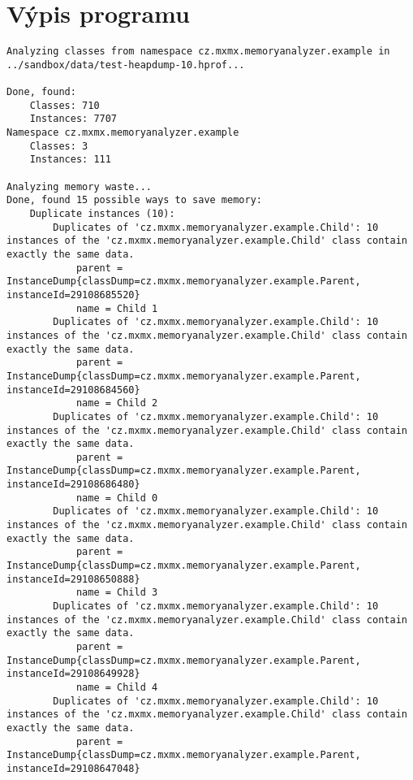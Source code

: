 \chapter{Výpis programu}
\label{runtime-log}
\begin{minipage}{\linewidth}
\begin{lstlisting}[basicstyle=\tiny,columns=fullflexible,frame=single,breaklines=true,postbreak=\mbox{\textcolor{red}{$\hookrightarrow$}\space}]
Analyzing classes from namespace cz.mxmx.memoryanalyzer.example in ../sandbox/data/test-heapdump-10.hprof...

Done, found:
    Classes: 710
    Instances: 7707
Namespace cz.mxmx.memoryanalyzer.example
    Classes: 3
    Instances: 111

Analyzing memory waste...
Done, found 15 possible ways to save memory:
    Duplicate instances (10):
        Duplicates of 'cz.mxmx.memoryanalyzer.example.Child': 10 instances of the 'cz.mxmx.memoryanalyzer.example.Child' class contain exactly the same data.
            parent = InstanceDump{classDump=cz.mxmx.memoryanalyzer.example.Parent, instanceId=29108685520}
            name = Child 1
        Duplicates of 'cz.mxmx.memoryanalyzer.example.Child': 10 instances of the 'cz.mxmx.memoryanalyzer.example.Child' class contain exactly the same data.
            parent = InstanceDump{classDump=cz.mxmx.memoryanalyzer.example.Parent, instanceId=29108684560}
            name = Child 2
        Duplicates of 'cz.mxmx.memoryanalyzer.example.Child': 10 instances of the 'cz.mxmx.memoryanalyzer.example.Child' class contain exactly the same data.
            parent = InstanceDump{classDump=cz.mxmx.memoryanalyzer.example.Parent, instanceId=29108686480}
            name = Child 0
        Duplicates of 'cz.mxmx.memoryanalyzer.example.Child': 10 instances of the 'cz.mxmx.memoryanalyzer.example.Child' class contain exactly the same data.
            parent = InstanceDump{classDump=cz.mxmx.memoryanalyzer.example.Parent, instanceId=29108650888}
            name = Child 3
        Duplicates of 'cz.mxmx.memoryanalyzer.example.Child': 10 instances of the 'cz.mxmx.memoryanalyzer.example.Child' class contain exactly the same data.
            parent = InstanceDump{classDump=cz.mxmx.memoryanalyzer.example.Parent, instanceId=29108649928}
            name = Child 4
        Duplicates of 'cz.mxmx.memoryanalyzer.example.Child': 10 instances of the 'cz.mxmx.memoryanalyzer.example.Child' class contain exactly the same data.
            parent = InstanceDump{classDump=cz.mxmx.memoryanalyzer.example.Parent, instanceId=29108647048}

\end{lstlisting}
\end{minipage}

